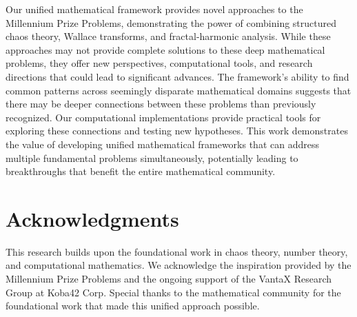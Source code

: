 \documentclass[12pt]{article}
\begin{document}
Our unified mathematical framework provides novel approaches to the Millennium Prize Problems, demonstrating the power of combining structured chaos theory, Wallace transforms, and fractal-harmonic analysis. While these approaches may not provide complete solutions to these deep mathematical problems, they offer new perspectives, computational tools, and research directions that could lead to significant advances. The framework's ability to find common patterns across seemingly disparate mathematical domains suggests that there may be deeper connections between these problems than previously recognized. Our computational implementations provide practical tools for exploring these connections and testing new hypotheses. This work demonstrates the value of developing unified mathematical frameworks that can address multiple fundamental problems simultaneously, potentially leading to breakthroughs that benefit the entire mathematical community.

\section{Acknowledgments}

This research builds upon the foundational work in chaos theory, number theory, and computational mathematics. We acknowledge the inspiration provided by the Millennium Prize Problems and the ongoing support of the VantaX Research Group at Koba42 Corp. Special thanks to the mathematical community for the foundational work that made this unified approach possible.



\end{document}
